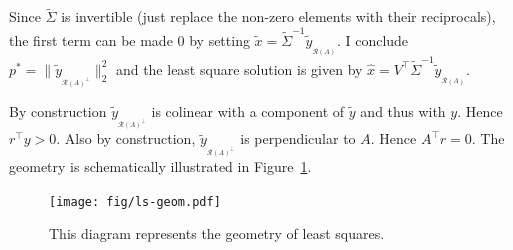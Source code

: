 \documentclass[]{article}
\theoremstyle{plain}
\theoremstyle{definition}
\theoremstyle{remark}
\begin{document}
Since $\tilde{\Sigma}$ is invertible (just replace the non-zero elements with
their reciprocals), the first term can be made $0$ by setting
$\tilde{x} = \tilde{\Sigma}^{-1} \tilde{y}_{_{\mathcal{R}(A)}}$.  I conclude $p^\ast =  \|\tilde{y}_{_{\mathcal{R}(A)^\perp}}\|_2^2$ and
the least square solution is given by $\hat{x} = V^\top\tilde{\Sigma}^{-1} \tilde{y}_{_{\mathcal{R}(A)}}$.

By construction $\tilde{y}_{_{\mathcal{R}(A)^\perp}}$ is colinear with a component of $\tilde{y}$
and thus with $y$.  Hence $r^\top y > 0$.  Also by construction, $\tilde{y}_{_{\mathcal{R}(A)^\perp}}$
is perpendicular to $A$.  Hence $A^\top r = 0$.  The geometry is schematically illustrated in
Figure~\ref{fig:ls-geom}.
\begin{figure}
  \begin{centering}
    \texttt{[image: fig/ls-geom.pdf]}\par
  \end{centering}
  \caption{\label{fig:ls-geom}This diagram represents the geometry of least squares.}
\end{figure}


\nocite{*}


\end{document}
